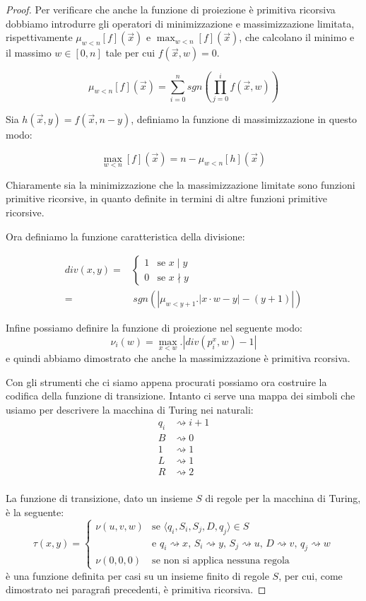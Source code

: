 \begin{proof}
Per verificare che anche la funzione di proiezione è primitiva
ricorsiva dobbiamo introdurre gli operatori di minimizzazione e
massimizzazione limitata, rispettivamente $\mu_{w<n}[f](\vec{x})$ e
$\max_{w<n}[f](\vec{x})$, che calcolano il minimo e il massimo $w \in
[0,n]$ tale per cui $f(\vec{x}, w) = 0$.

$$\mu_{w<n}[f](\vec{x}) = \sum_{i=0}^n sgn\left(\prod_{j=0}^i
f(\vec{x},w)\right)$$

Sia $h(\vec{x},y) = f(\vec{x},n-y)$, definiamo la funzione di
massimizzazione in questo modo:

$$\max_{w<n}[f](\vec{x}) = n-\mu_{w<n}[h](\vec{x})$$

Chiaramente sia la minimizzazione che la massimizzazione limitate sono
funzioni primitive ricorsive, in quanto definite in termini di altre
funzioni primitive ricorsive.

Ora definiamo la funzione caratteristica della divisione:

\begin{align*}
div(x,y) =& \left\{
\begin{array}{ll}
1 & \text{se } x \mid y\\
0 & \text{se } x \nmid y
\end{array}
\right. \\
=& \, sgn\left( \left| \mu_{w<y+1}.\left|x \cdot w - y \right| - (y+1)\right|
\right)
\end{align*}

Infine possiamo definire la funzione di proiezione nel seguente modo:
$$\nu_i(w) = \max_{x<w}.\left| div(p_i^x, w) - 1\right|$$ e quindi
abbiamo dimostrato che anche la massimizzazione è primitiva rcorsiva.

Con gli strumenti che ci siamo appena procurati possiamo ora costruire
la codifica della funzione di transizione. Intanto ci serve una mappa
dei simboli che usiamo per descrivere la macchina di Turing nei
naturali:
\begin{align*}
q_i &\rightsquigarrow i+1\\
B &\rightsquigarrow 0\\
1 &\rightsquigarrow 1\\
L &\rightsquigarrow 1\\
R &\rightsquigarrow 2\\
\end{align*}

La funzione di transizione, dato un insieme $S$ di regole per la
macchina di Turing, è la seguente:
$$\tau(x,y) = \left\{
\begin{array}{ll}
\nu(u,v,w) & \text{se $\langle q_i, S_i, S_j, D, q_j \rangle \in
  S$}\\ & \text{e $q_i \rightsquigarrow x$, $S_i \rightsquigarrow y$,
  $S_j \rightsquigarrow u$, $D \rightsquigarrow v$, $q_j
  \rightsquigarrow w$}\\ \nu(0,0,0) & \text{se non si applica nessuna
  regola}
\end{array}
\right.$$ è una funzione definita per casi su un insieme finito di
regole $S$, per cui, come dimostrato nei paragrafi precedenti, è
primitiva ricorsiva.


\end{proof}
